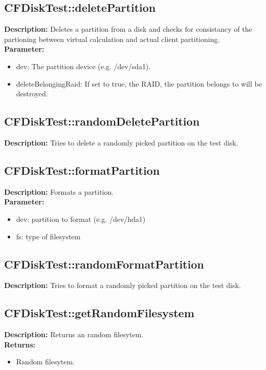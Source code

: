 \subsection{CFDiskTest::deletePartition}
\textbf{Description:} Deletes a partition from a disk and checks for consistancy of the partioning between virtual calculation and actual client partitioning.\\
\textbf{Parameter:}
\begin{itemize}
\item dev: The partition device (e.g. /dev/sda1).
\item deleteBelongingRaid: If set to true, the RAID, the partition belongs to will be destroyed.
\end{itemize}

\subsection{CFDiskTest::randomDeletePartition}
\textbf{Description:} Tries to delete a randomly picked partition on the test disk.\\

\subsection{CFDiskTest::formatPartition}
\textbf{Description:} Formats a partition.\\
\textbf{Parameter:}
\begin{itemize}
\item dev: partition to format (e.g. /dev/hda1)
\item fs: type of filesystem
\end{itemize}

\subsection{CFDiskTest::randomFormatPartition}
\textbf{Description:} Tries to format a randomly picked partition on the test disk.\\

\subsection{CFDiskTest::getRandomFilesystem}
\textbf{Description:} Returns an random filesytem.\\
\textbf{Returns:}
\begin{itemize}
\item Random filesytem.
\end{itemize}


